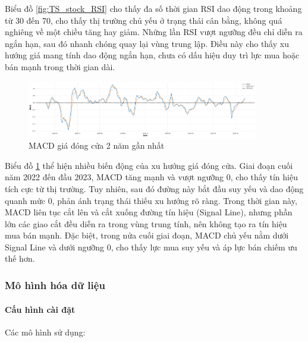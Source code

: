      Biểu đồ  \ref{fig:TS_stock_RSI} cho thấy đa số thời gian RSI dao động trong khoảng từ 30 đến 70, cho thấy thị trường chủ yếu ở trạng thái cân bằng, không quá nghiêng về một chiều tăng hay giảm. Những lần RSI vượt ngưỡng đều chỉ diễn ra ngắn hạn, sau đó nhanh chóng quay lại vùng trung lập. Điều này cho thấy xu hướng giá mang tính dao động ngắn hạn, chưa có dấu hiệu duy trì lực mua hoặc bán mạnh trong thời gian dài.

     \begin{figure}[htp]
        \centering
        \includegraphics[width=0.90\textwidth]{images/TS_stock_MACD.png}
        \caption{MACD giá đóng cửa 2 năm gần nhất}
        \label{fig:TS_stock_MACD}
    \end{figure}
    \FloatBarrier

    Biểu đồ \ref{fig:TS_stock_MACD} thể hiện nhiều biến động của xu hướng giá đóng cửa. Giai đoạn cuối năm 2022 đến đầu 2023, MACD tăng mạnh và vượt ngưỡng 0, cho thấy tín hiệu tích cực từ thị trường. Tuy nhiên, sau đó đường này bắt đầu suy yếu và dao động quanh mức 0, phản ánh trạng thái thiếu xu hướng rõ ràng. Trong thời gian này, MACD liên tục cắt lên và cắt xuống đường tín hiệu (Signal Line), nhưng phần lớn các giao cắt đều diễn ra trong vùng trung tính, nên không tạo ra tín hiệu mua bán mạnh. Đặc biệt, trong nửa cuối giai đoạn, MACD chủ yếu nằm dưới Signal Line và dưới ngưỡng 0, cho thấy lực mua suy yếu và áp lực bán chiếm ưu thế hơn.

\subsubsection{Mô hình hóa dữ liệu}
    \paragraph{Cấu hình cài đặt} 
    \leavevmode

    Các mô hình sử dụng:

